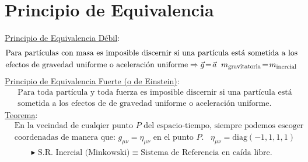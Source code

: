 \section*{Principio de Equivalencia}
\underline{Principio de Equivalencia Débil}:
\begin{align*}
&\text{Para partículas con masa es imposible discernir si una partícula está sometida a los}\\
&\text{efectos de gravedad uniforme o aceleración uniforme}\Rightarrow \vec{g}\!=\!\vec{a} \; \; m_{\scalebox{0.8}{\text{gravitatoria}}}\!=\!  m_{\scalebox{0.8}{\text{inercial}}}
\end{align*}
\underline{Principio de Equivalencia Fuerte (o de Einstein)}:
\begin{align*}
&\text{Para toda partícula y toda fuerza es imposible discernir si una partícula está}\\
&\text{sometida a los efectos de  de gravedad uniforme o aceleración uniforme.}
\end{align*}
\underline{Teorema}:
\begin{align*}
    &\text{En la vecindad de cualqier punto $P$ del espacio-tiempo, siempre podemos escoger}\\
    &\text{coordenadas de manera que: } g_{\mu \nu }= 
    \eta_{\mu\nu} \text{ en el punto $P$.}\;\;\; \eta_{\mu\nu}= \text{diag}(-1,1,1,1) 
    \end{align*}
    \vspace{1pt}
\begin{align*}
\blacktriangleright
\text{ S.R. Inercial (Minkowski)} \equiv \text{Sistema de Referencia en caída libre.}
\end{align*}
